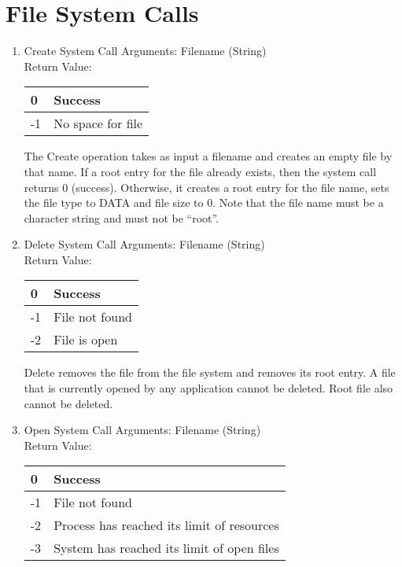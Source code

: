 \section{File System Calls}
\begin{enumerate}
\item{Create System Call}
Arguments: Filename (String)\\
Return Value:
\FloatBarrier \begin{table}[H]
\centering
\begin{tabular}{|l|l|}
\hline
0  & Success           \\ \hline
-1 & No space for file \\ \hline
\end{tabular}
\end{table} \FloatBarrier 

The Create operation takes as input a filename and creates an empty file by that name. If a root entry for the file already exists, then the system call returns 0 (success). Otherwise, it creates a root entry for the file name, sets the file type to DATA and file size to 0. Note that the file name must be a character string and must not be “root”. 


\item{Delete System Call}
Arguments: Filename (String)\\
Return Value:
\FloatBarrier \begin{table}[H]
\centering
\begin{tabular}{|l|l|}
\hline
0  & Success           \\ \hline
-1 & File not found \\ \hline
-2 & File is open \\ \hline
\end{tabular}
\end{table} \FloatBarrier 

Delete removes the file from the file system and removes its root entry. A file that is currently opened by any application cannot be deleted. Root file also cannot be deleted.
 

\item{Open System Call}
Arguments: Filename (String)\\
Return Value:
\FloatBarrier \begin{table}[H]
\centering
\begin{tabular}{|l|l|}
\hline
0  & Success           \\ \hline
-1 & File not found \\ \hline
-2 & Process has reached its limit of resources \\ \hline
-3 & System has reached its limit of open files \\ \hline
\end{tabular}
\end{table} \FloatBarrier 


\end{enumerate}
